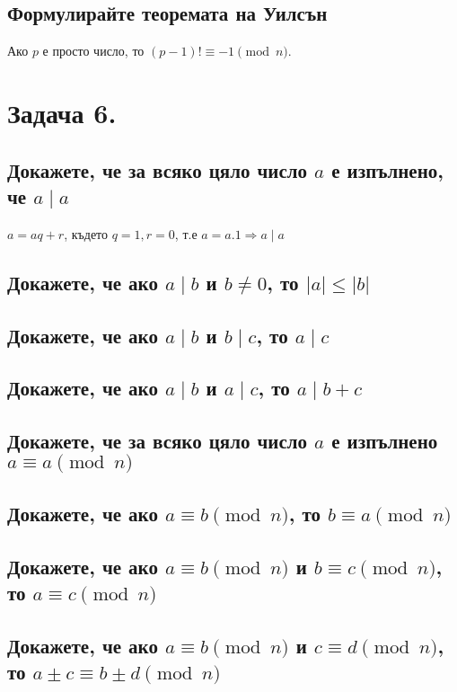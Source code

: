 \documentclass[10pt]{article}
\begin{document}
\subsection*{Формулирайте теоремата на Уилсън}
Ако $p$ е просто число, то $(p - 1)! \equiv -1 \pmod{n}.$

\section*{Задача 6.}

\subsection*{Докажете, че за всяко цяло число $a$ е изпълнено, че $a \mid a$}
$a = aq + r$, където $q = 1, r = 0$, т.е $a = a.1 \Rightarrow a \mid a$

\subsection*{Докажете, че ако $a \mid b$ и $b \neq 0$, то $|a| \leq |b|$}


\subsection*{Докажете, че ако $a \mid b$ и $b \mid c$, то $a \mid c$}
\subsection*{Докажете, че ако $a \mid b$ и $a \mid c$, то $a \mid b + c$}
\subsection*{Докажете, че за всяко цяло число $a$ е изпълнено $a \equiv a \pmod{n}$}
\subsection*{Докажете, че ако $a \equiv b \pmod{n}$, то $b \equiv a \pmod{n}$} 
\subsection*{Докажете, че ако $a \equiv b \pmod{n}$ и $b \equiv c \pmod{n}$, то $a \equiv c \pmod{n}$}
\subsection*{Докажете, че ако $a \equiv b \pmod{n}$ и $c \equiv d \pmod{n}$, то $a \pm c \equiv b \pm d \pmod{n}$}
\end{document}
